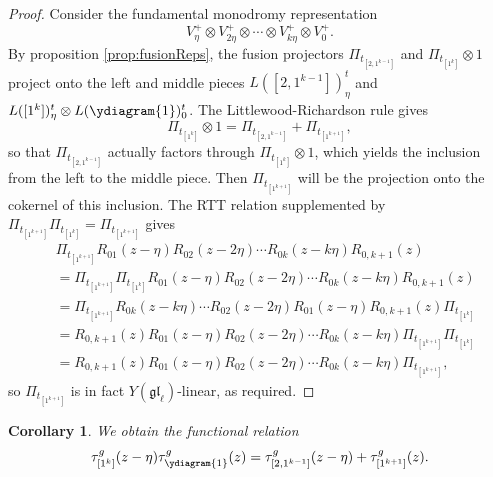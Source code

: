 \documentclass[11pt]{report}
\newtheorem{corollary}[theorem]{Corollary}
\theoremstyle{definition}
\theoremstyle{remark}
\theoremstyle{remark}
\begin{document}
\begin{proof}
Consider the fundamental monodromy representation
\begin{equation*}
V_{\eta}^+ \otimes V_{2\eta}^+ \otimes \cdots \otimes V_{k\eta}^+ \otimes V_0^+.
\end{equation*}
By proposition \ref{prop:fusionReps}, the fusion projectors $\Pi_{t_{[2,1^{k-1}]}}$ and $\Pi_{t_{[1^k]}} \otimes 1$ project onto the left and middle pieces $L([2,1^{k-1}])_\eta^t$ and $L([1^k])_\eta^t \otimes L(\ydiagram{1})_0^t$. The Littlewood-Richardson rule gives
\begin{equation*}
\Pi_{t_{[1^k]}} \otimes 1 = \Pi_{t_{[2,1^{k-1}]}} + \Pi_{t_{[1^{k+1}]}},
\end{equation*}
so that $\Pi_{t_{[2,1^{k-1}]}}$ actually factors through $\Pi_{t_{[1^k]}} \otimes 1$, which yields the inclusion from the left to the middle piece. Then $\Pi_{t_{[1^{k+1}]}}$ will be the projection onto the cokernel of this inclusion. The RTT relation supplemented by $\Pi_{t_{[1^{k+1}]}} \Pi_{t_{[1^k]}} = \Pi_{t_{[1^{k+1}]}}$ gives
\begin{align*}
&\Pi_{t_{[1^{k+1}]}} R_{01}(z-\eta) R_{02}(z-2\eta) \cdots R_{0k}(z-k\eta) R_{0,k+1}(z) \\
&= \Pi_{t_{[1^{k+1}]}} \Pi_{t_{[1^k]}} R_{01}(z-\eta) R_{02}(z-2\eta) \cdots R_{0k}(z-k\eta) R_{0,k+1}(z) \\
&= \Pi_{t_{[1^{k+1}]}} R_{0k}(z-k\eta) \cdots R_{02}(z-2\eta) R_{01}(z-\eta) R_{0,k+1}(z) \Pi_{t_{[1^k]}} \\
&= R_{0,k+1}(z) R_{01}(z-\eta) R_{02}(z-2\eta) \cdots R_{0k}(z-k\eta) \Pi_{t_{[1^{k+1}]}} \Pi_{t_{[1^k]}} \\
&= R_{0,k+1}(z) R_{01}(z-\eta) R_{02}(z-2\eta) \cdots R_{0k}(z-k\eta) \Pi_{t_{[1^{k+1}]}},
\end{align*}
so $\Pi_{t_{[1^{k+1}]}}$ is in fact $Y(\mathfrak{gl}_\ell)$-linear, as required.
\end{proof}

\begin{corollary}
We obtain the functional relation
\begin{equation}\label{equation:functionalRelation}
\tau_{[1^k]}^g(z-\eta) \tau_{\ydiagram{1}}^g(z) = \tau_{[2,1^{k-1}]}^g(z-\eta) + \tau_{[1^{k+1}]}^g(z).
\end{equation}
\end{corollary}
\end{document}
